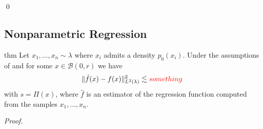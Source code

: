 \documentclass[11pt]{article}
\begin{document}
\qed{}

\subsection{Nonparametric Regression}

\begin{restatable}{thm}{} 
    Let $x_1, \dots, x_n \sim \lambda$ where $x_i$ admits a density $p_0(x_i)$. Under the assumptions of  and for some $x\in \mathcal{B}(0, r)$ we have
    \[\|\hat{f}(x) - f(x)\|_{L^2(\lambda)}^2 \lesssim \textcolor{red}{something} \]
    with $s = \Pi(x)$, where $\hat{f}$ is an estimator of the regression function computed from the samples $x_1, \dots, x_n$.
\end{restatable}
\noindent \textit{Proof.} 

\end{document}
